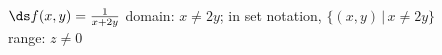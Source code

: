 {$\ds f(x,y) = \frac{1}{x+2y}$}
{domain: $x\neq 2y$; in set notation, $\{(x,y)\,|\, x\neq 2y\}$\\
range: $z\neq 0$}
